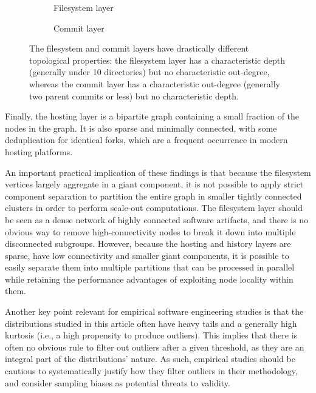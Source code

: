 \begin{figure}
    \begin{subfigure}{.55\textwidth}
        \centering
        
        \caption{Filesystem layer}%
        \label{fig:topology-summary-filesystem}
    \end{subfigure}\hfill%
    \begin{subfigure}{.40\textwidth}
        \centering
        
        \caption{Commit layer}%
        \label{fig:topology-summary-revision}
    \end{subfigure}
    \caption{The filesystem and commit layers have drastically different
    topological properties: the filesystem layer has a characteristic depth
    (generally under 10 directories) but no characteristic out-degree, whereas
    the commit layer has a characteristic out-degree (generally two parent
    commits or less) but no characteristic depth.}
    \label{fig:topology-summary}
\end{figure}

Finally, the hosting layer is a bipartite graph containing a small fraction of
the nodes in the graph. It is also sparse and minimally connected, with some
deduplication for identical forks, which are a frequent occurrence in modern
hosting platforms.

An important practical implication of these findings is that because the
filesystem vertices largely aggregate in a giant component, it is not possible
to apply strict component separation to partition the entire graph in smaller
tightly connected clusters in order to perform scale-out computations. The
filesystem layer should be seen as a dense network of highly connected software
artifacts, and there is no obvious way to remove high-connectivity nodes to
break it down into multiple disconnected subgroups.  However, because the
hosting and history layers are sparse, have low connectivity and smaller
giant components, it is possible to easily separate them into multiple
partitions that can be processed in parallel while retaining the performance
advantages of exploiting node locality within them.

Another key point relevant for empirical software engineering studies is that
the distributions studied in this article often have heavy tails and a
generally high kurtosis (i.e., a high propensity to produce outliers). This
implies that there is often no obvious rule to filter out outliers after a
given threshold, as they are an integral part of the distributions' nature.  As
such, empirical studies should be cautious to systematically justify how they
filter outliers in their methodology, and consider sampling biases as potential
threats to validity.

